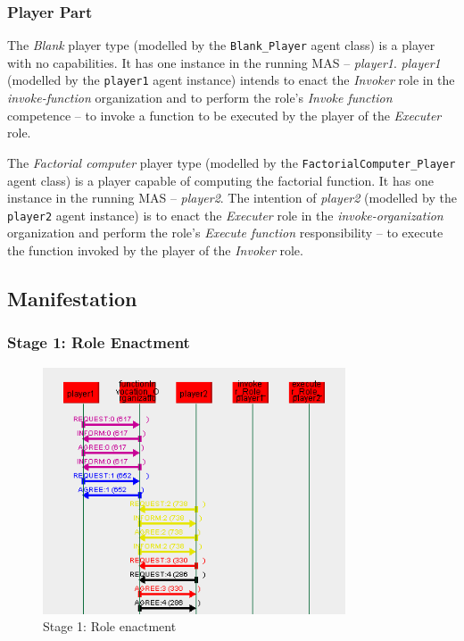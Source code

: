 \subsubsection*{Player Part}

The \textit{Blank} player type (modelled by the \texttt{Blank\_Player} agent class) is a player with no capabilities.
It has one instance in the running MAS -- \textit{player1}.
\textit{player1} (modelled by the \texttt{player1} agent instance) intends to enact the \textit{Invoker} role in the \textit{invoke-function} organization and to perform the role's \textit{Invoke function} competence -- to invoke a function to be executed by the player of the \textit{Executer} role.

The \textit{Factorial computer} player type (modelled by the \texttt{FactorialComputer\_Player} agent class) is a player capable of computing the factorial function.
It has one instance in the running MAS -- \textit{player2}.
The intention of \textit{player2} (modelled by the \texttt{player2} agent instance) is to enact the \textit{Executer} role in the \textit{invoke-organization} organization and perform the role's \textit{Execute function} responsibility -- to execute the function invoked by the player of the \textit{Invoker} role.

\subsection*{Manifestation}

\subsubsection*{Stage 1: Role Enactment}

\begin{figure}[H]
	\centering
	\includegraphics[width=0.8\textwidth]{images/examples/example1-stage1.png}
	\caption{Stage 1: Role enactment}
	\label{figure:example1-stage1}
\end{figure}

